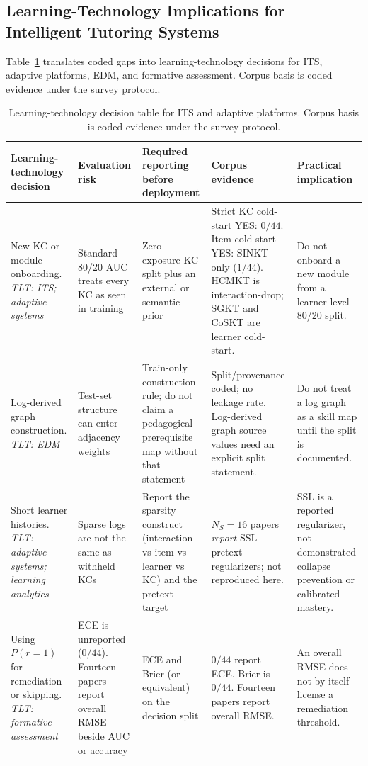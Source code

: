 \documentclass[lettersize,journal]{IEEEtran}
\begin{document}
\subsection{Learning-Technology Implications for Intelligent Tutoring Systems}
Table~\ref{tab:its_implications} translates coded gaps into learning-technology decisions for ITS, adaptive platforms, EDM, and formative assessment. Corpus basis is coded evidence under the survey protocol.
\begin{table}[t]
\caption{Learning-technology decision table for ITS and adaptive platforms. Corpus basis is coded evidence under the survey protocol.}
\label{tab:its_implications}
\centering
\footnotesize
\setlength{\tabcolsep}{2.8pt}
\begin{tabular}{@{}>{\raggedright\arraybackslash}p{}
>{\raggedright\arraybackslash}p{}
>{\raggedright\arraybackslash}p{}
>{\raggedright\arraybackslash}p{}
>{\raggedright\arraybackslash}p{}@{}}
\toprule
\textbf{Learning-technology decision} & \textbf{Evaluation risk} & \textbf{Required reporting before deployment} & \textbf{Corpus evidence} & \textbf{Practical implication} \\
\midrule
New KC or module onboarding.
\textit{TLT: ITS; adaptive systems} & Standard 80/20 AUC treats every KC as seen in training & Zero-exposure KC split plus an external or semantic prior & Strict KC cold-start YES: $0/44$. Item cold-start YES: SINKT only ($1/44$). HCMKT is interaction-drop; SGKT and CoSKT are learner cold-start. & Do not onboard a new module from a learner-level 80/20 split. \\
Log-derived graph construction.
\textit{TLT: EDM} & Test-set structure can enter adjacency weights & Train-only construction rule; do not claim a pedagogical prerequisite map without that statement & Split/provenance coded; no leakage rate. Log-derived graph source values need an explicit split statement. & Do not treat a log graph as a skill map until the split is documented. \\
Short learner histories.
\textit{TLT: adaptive systems; learning analytics} & Sparse logs are not the same as withheld KCs & Report the sparsity construct (interaction vs item vs learner vs KC) and the pretext target & $N_S=16$ papers \emph{report} SSL pretext regularizers; not reproduced here. & SSL is a reported regularizer, not demonstrated collapse prevention or calibrated mastery. \\
Using $P(r=1)$ for remediation or skipping.
\textit{TLT: formative assessment} & ECE is unreported ($0/44$). Fourteen papers report overall RMSE beside AUC or accuracy & ECE and Brier (or equivalent) on the decision split & $0/44$ report ECE. Brier is $0/44$. Fourteen papers report overall RMSE. & An overall RMSE does not by itself license a remediation threshold. \\

\end{tabular}
\end{table}
\end{document}
